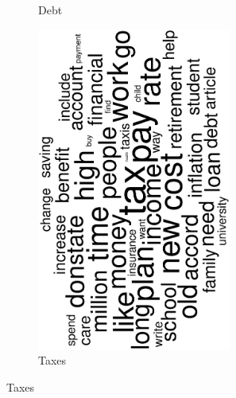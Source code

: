 \begin{figure}
\begin{subfigure}{0.32\textwidth}
		\caption{Debt}
	\end{subfigure}
	\begin{subfigure}{0.32\textwidth}
		\includegraphics[width=0.7\textwidth,angle=270]{figures/wordcloud13.eps}
		\caption{Taxes}
	\end{subfigure}
	

\end{figure}
